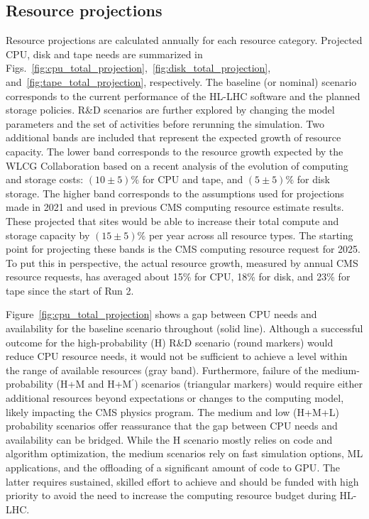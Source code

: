 \subsection{Resource projections}
\label{resourceprojections}

Resource projections are calculated annually for each resource category. Projected \gls{CPU}, disk and tape needs are summarized in Figs.~\ref{fig:cpu_total_projection},~\ref{fig:disk_total_projection}, and~\ref{fig:tape_total_projection}, respectively.
The baseline (or nominal) scenario corresponds to the current performance of the \gls{HL-LHC} software and the planned storage policies. R\&D scenarios are further explored by changing the model parameters and the set of activities before rerunning the simulation. Two additional bands are included that represent the expected growth of resource capacity. 
The lower band corresponds to the resource growth expected by the WLCG Collaboration based on a recent analysis of the evolution of computing and storage costs: $(10 \pm 5)\%$ for \gls{CPU} and tape, and $(5 \pm 5)\%$ for disk storage. The higher band corresponds to the assumptions used for projections made in 2021 and used in previous CMS computing resource estimate results. These projected that sites would be able to increase their total compute and storage capacity by $(15 \pm 5)\%$ per year across all resource types. 
The starting point for projecting these bands is the CMS computing resource request for 2025.  To put this in perspective, the actual resource growth, measured by annual CMS resource requests, has averaged about 15\% for CPU, 18\% for disk, and 23\% for tape since the start of Run 2.

Figure~\ref{fig:cpu_total_projection} shows a gap between \gls{CPU} needs and availability for the baseline scenario throughout \PhaseTwo (solid line). 
Although a successful outcome for the high-probability (H) R\&D scenario (round markers) would reduce \gls{CPU} resource needs, it would not be sufficient to achieve a level within the range of available resources (gray band). Furthermore, failure of the medium-probability (H+M and H+M$^{\prime}$) scenarios (triangular markers) would require either additional resources beyond expectations or changes to the computing model, likely impacting the CMS physics program.
The medium and low (H+M+L) probability scenarios offer reassurance that the gap between \gls{CPU} needs and availability can be bridged. While the H scenario mostly relies on code and algorithm optimization, the medium scenarios rely on fast simulation options, ML applications, and the offloading of a significant amount of code to \gls{GPU}. 
The latter requires sustained, skilled effort to achieve and should be funded with high priority to avoid the need to increase the computing resource budget during HL-LHC.

